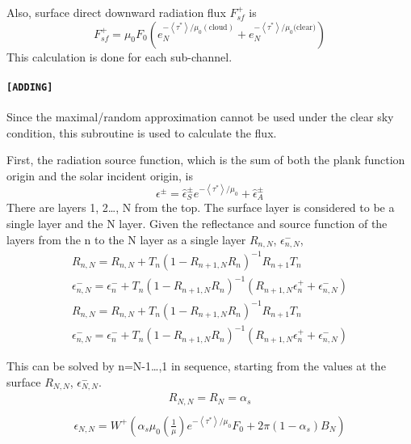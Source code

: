 Also, surface direct downward radiation flux \(F_{s f}^{+}\) is \begin{equation}
F_{s f}^{+}=\mu_{0} F_{0}\left(e_{N}^{-\left\langle\tau^{*}\right\rangle / \mu_{0}(\text {cloud})}+e_{N}^{-\left\langle\tau^{*}\right\rangle / \mu_{0} \text{(clear)}}\right)
\end{equation} This calculation is done for each sub-channel.

\hypertarget{adding}{%
\paragraph{\texorpdfstring{\texttt{{[}ADDING{]}}}{{[}ADDING{]}}}\label{adding}}

Since the maximal/random approximation cannot be used under the clear
sky condition, this subroutine is used to calculate the flux.

First, the radiation source function, which is the sum of both the plank
function origin and the solar incident origin, is \begin{equation}
\epsilon^{\pm}=\hat{\epsilon}_{S}^{\pm} e^{-\left\langle\tau^{*}\right\rangle / \mu_{0}}+\hat{\epsilon}_{A}^{\pm}
\end{equation} There are layers 1, 2\ldots, N from the top. The surface layer is
considered to be a single layer and the N layer. Given the reflectance
and source function of the layers from the n to the N layer as a single
layer \(R_{n, N}\), \(\epsilon_{n, N}^{-}\), \begin{equation}
\begin{array}{c}
R_{n, N}=R_{n, N}+T_{n}\left(1-R_{n+1, N} R_{n}\right)^{-1} R_{n+1} T_{n} \\
\epsilon_{n, N}^{-}=\epsilon_{n}^{-}+T_{n}\left(1-R_{n+1, N} R_{n}\right)^{-1}\left(R_{n+1, N} \epsilon_{n}^{+}+\epsilon_{n, N}^{-}\right)
\end{array}
\end{equation} \begin{equation}
\begin{array}{c}
R_{n, N}=R_{n, N}+T_{n}\left(1-R_{n+1, N} R_{n}\right)^{-1} R_{n+1} T_{n} \\
\epsilon_{n, N}^{-}=\epsilon_{n}^{-}+T_{n}\left(1-R_{n+1, N} R_{n}\right)^{-1}\left(R_{n+1, N} \epsilon_{n}^{+}+\epsilon_{n, N}^{-}\right)
\end{array}
\end{equation}

This can be solved by n=N-1\ldots,1 in sequence, starting from the
values at the surface \(R_{N, N}\), \(\epsilon_{N, N}^{-}\). \begin{equation}
\begin{array}{c}
R_{N, N}=R_{N}=\alpha_{s} \\
\end{array}
\end{equation} \begin{equation}
\begin{array}{c}
\epsilon_{N, N}=W^{+}\left(\alpha_{s} \mu_{0}\left(\frac{1}{\mu}\right) e^{-\left\langle\tau^{*}\right\rangle / \mu_{0}} F_{0}+2 \pi\left(1-\alpha_{s}\right) B_{N}\right)
\end{array}
\end{equation}

